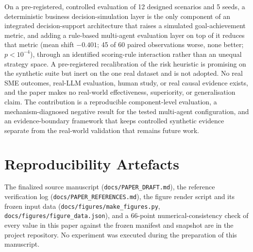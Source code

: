 \documentclass[conference]{IEEEtran}
\newcommand{\code}[1]{\texttt{#1}}
\begin{document}
On a pre-registered, controlled evaluation of 12 designed scenarios and 5 seeds,
a deterministic business decision-simulation layer is the only component of an
integrated decision-support architecture that raises a simulated
goal-achievement metric, and adding a rule-based multi-agent evaluation layer on
top of it reduces that metric (mean shift $-0.401$; 45 of 60 paired observations
worse, none better; $p < 10^{-4}$), through an identified scoring-rule
interaction rather than an unequal strategy space. A pre-registered recalibration
of the risk heuristic is promising on the synthetic suite but inert on the one
real dataset and is not adopted. No real SME outcomes, real-LLM evaluation,
human study, or real causal evidence exists, and the paper makes no real-world
effectiveness, superiority, or generalisation claim. The contribution is a
reproducible component-level evaluation, a mechanism-diagnosed negative result
for the tested multi-agent configuration, and an evidence-boundary framework
that keeps controlled synthetic evidence separate from the real-world validation
that remains future work.

\section*{Reproducibility Artefacts}
The finalized source manuscript (\code{docs/PAPER\_DRAFT.md}), the reference
verification log (\code{docs/PAPER\_REFERENCES.md}), the figure render script and
its frozen input data (\code{docs/figures/make\_figures.py},
\code{docs/figures/figure\_data.json}), and a 66-point numerical-consistency
check of every value in this paper against the frozen manifest and snapshot are
in the project repository. No experiment was executed during the preparation of
this manuscript.



\end{document}
